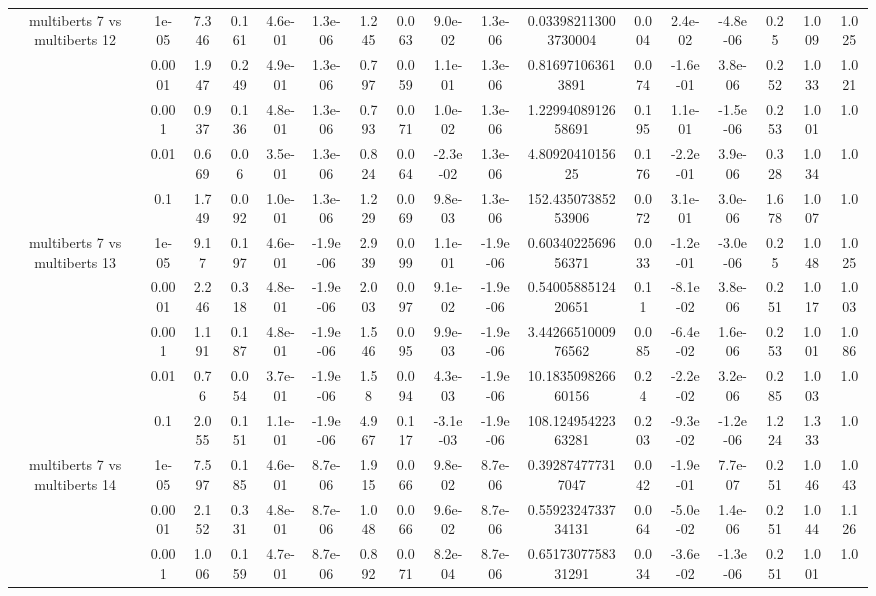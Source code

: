 \begin{tabular}{|c|c|c|c|c|c|c|c|c|c|c|c|c|c|c|c|c|}
\hline
\multirow{5}{*}{multiberts 7 vs multiberts 12} & 1e-05 & 7.346 & 0.161 & 4.6e-01 & 1.3e-06 & 1.245 & 0.063 & 9.0e-02 & 1.3e-06 & 0.033982113003730004 & 0.004 & 2.4e-02 & -4.8e-06 & 0.25 & 1.009 & 1.025 \\
 & 0.0001 & 1.947 & 0.249 & 4.9e-01 & 1.3e-06 & 0.797 & 0.059 & 1.1e-01 & 1.3e-06 & 0.816971063613891 & 0.074 & -1.6e-01 & 3.8e-06 & 0.252 & 1.033 & 1.021 \\
 & 0.001 & 0.937 & 0.136 & 4.8e-01 & 1.3e-06 & 0.793 & 0.071 & 1.0e-02 & 1.3e-06 & 1.2299408912658691 & 0.195 & 1.1e-01 & -1.5e-06 & 0.253 & 1.001 & 1.0 \\
 & 0.01 & 0.669 & 0.06 & 3.5e-01 & 1.3e-06 & 0.824 & 0.064 & -2.3e-02 & 1.3e-06 & 4.8092041015625 & 0.176 & -2.2e-01 & 3.9e-06 & 0.328 & 1.034 & 1.0 \\
 & 0.1 & 1.749 & 0.092 & 1.0e-01 & 1.3e-06 & 1.229 & 0.069 & 9.8e-03 & 1.3e-06 & 152.43507385253906 & 0.072 & 3.1e-01 & 3.0e-06 & 1.678 & 1.007 & 1.0 \\
\hline
\multirow{5}{*}{multiberts 7 vs multiberts 13} & 1e-05 & 9.17 & 0.197 & 4.6e-01 & -1.9e-06 & 2.939 & 0.099 & 1.1e-01 & -1.9e-06 & 0.6034022569656371 & 0.033 & -1.2e-01 & -3.0e-06 & 0.25 & 1.048 & 1.025 \\
 & 0.0001 & 2.246 & 0.318 & 4.8e-01 & -1.9e-06 & 2.003 & 0.097 & 9.1e-02 & -1.9e-06 & 0.5400588512420651 & 0.11 & -8.1e-02 & 3.8e-06 & 0.251 & 1.017 & 1.003 \\
 & 0.001 & 1.191 & 0.187 & 4.8e-01 & -1.9e-06 & 1.546 & 0.095 & 9.9e-03 & -1.9e-06 & 3.4426651000976562 & 0.085 & -6.4e-02 & 1.6e-06 & 0.253 & 1.001 & 1.086 \\
 & 0.01 & 0.76 & 0.054 & 3.7e-01 & -1.9e-06 & 1.58 & 0.094 & 4.3e-03 & -1.9e-06 & 10.183509826660156 & 0.24 & -2.2e-02 & 3.2e-06 & 0.285 & 1.003 & 1.0 \\
 & 0.1 & 2.055 & 0.151 & 1.1e-01 & -1.9e-06 & 4.967 & 0.117 & -3.1e-03 & -1.9e-06 & 108.12495422363281 & 0.203 & -9.3e-02 & -1.2e-06 & 1.224 & 1.333 & 1.0 \\
\hline
\multirow{5}{*}{multiberts 7 vs multiberts 14} & 1e-05 & 7.597 & 0.185 & 4.6e-01 & 8.7e-06 & 1.915 & 0.066 & 9.8e-02 & 8.7e-06 & 0.392874777317047 & 0.042 & -1.9e-01 & 7.7e-07 & 0.251 & 1.046 & 1.043 \\
 & 0.0001 & 2.152 & 0.331 & 4.8e-01 & 8.7e-06 & 1.048 & 0.066 & 9.6e-02 & 8.7e-06 & 0.5592324733734131 & 0.064 & -5.0e-02 & 1.4e-06 & 0.251 & 1.044 & 1.126 \\
 & 0.001 & 1.006 & 0.159 & 4.7e-01 & 8.7e-06 & 0.892 & 0.071 & 8.2e-04 & 8.7e-06 & 0.6517307758331291 & 0.034 & -3.6e-02 & -1.3e-06 & 0.251 & 1.001 & 1.0 \\

\end{tabular}
